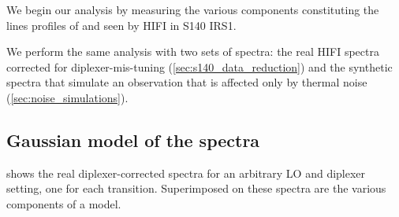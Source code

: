 We begin our analysis by measuring the various components constituting the lines profiles of  and  seen by HIFI in S140 IRS1.

We perform the same analysis with two sets of spectra:
the real HIFI spectra corrected for diplexer-mis-tuning (\cref{sec:s140_data_reduction})
and
the synthetic spectra that simulate an observation that is affected only by thermal noise (\cref{sec:noise_simulations}).


\FloatBarrier
\subsection{Gaussian model of the spectra}
\label{sec:chp5_gaussian_model}
 shows the real diplexer-corrected spectra for an arbitrary LO and diplexer setting, one for each transition.
Superimposed on these spectra are the various components of a model.

